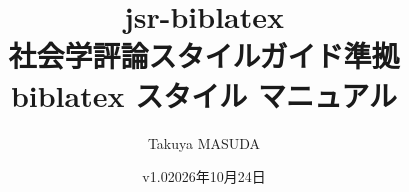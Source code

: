 \documentclass[a4paper,10pt,oneside,line_length=37zw,number_of_lines=40]{jlreq}
\title{jsr-biblatex\\[.5\zh]社会学評論スタイルガイド準拠\\[.2\zh]biblatex スタイル マニュアル}
\author{Takuya MASUDA}
\date{v1.0\quad 2026年10月24日}
\begin{document}
\maketitle
\nocite{*}
\clearpage
\tableofcontents
\clearpage

\end{document}
